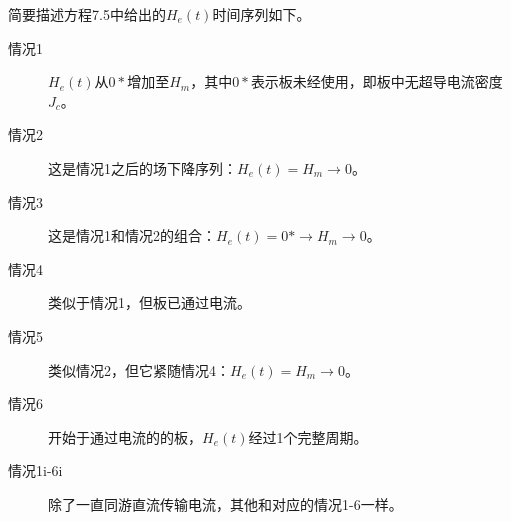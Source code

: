 简要描述方程7.5中给出的$H_e(t)$时间序列如下。
\begin{description}
	\item[情况1] $H_e(t)$从$0*$增加至$H_m$，其中$0*$表示板未经使用，即板中无超导电流密度$J_c$。
	\item[情况2] 这是情况1之后的场下降序列：$H_e(t)=H_m\rightarrow 0$。
	\item[情况3] 这是情况1和情况2的组合：$H_e(t)=0*\rightarrow H_m\rightarrow 0$。
	\item[情况4] 类似于情况1，但板已通过电流。
	\item[情况5] 类似情况2，但它紧随情况4：$H_e(t)=H_m\rightarrow 0$。
	\item[情况6] 开始于通过电流的的板，$H_e(t)$经过1个完整周期。
	\item[情况1i-6i] 除了一直同游直流传输电流，其他和对应的情况1-6一样。
\end{description}

